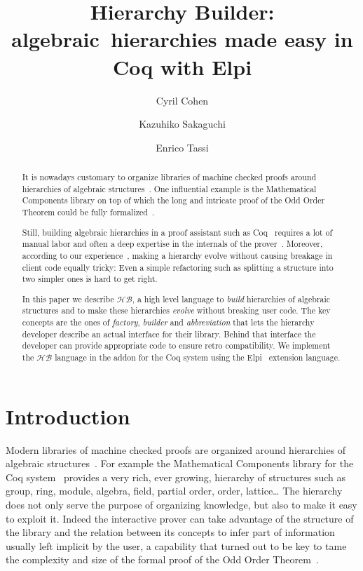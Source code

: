 \documentclass[a4paper,UKenglish,cleveref, autoref]{lipics-v2019}
\title{Hierarchy Builder: algebraic~hierarchies made easy in Coq with Elpi} %
\author{Cyril Cohen}{Inria, France}{Cyril.Cohen@inria.fr}{}{}
\author{Kazuhiko Sakaguchi}{University of Tsukuba, Japan}{sakaguchi@logic.cs.tsukuba.ac.jp}{}{}
\author{Enrico Tassi}{Inria, France}{Enrico.Tassi@inria.fr}{}{}
\newcommand{\HB}{\ensuremath{\mathcal{HB}}}
\newcommand{\hb}{\coq{hierarchy-builder}}
\newcommand{\factory}{factory}
\newcommand{\phantterm}{abbreviation}
\newcommand{\mixinbuilder}{builder}
\theoremstyle{implem}
\theoremstyle{implem}
\theoremstyle{command}
\begin{document}
\maketitle

\begin{abstract}
It is nowadays customary to organize libraries of machine checked
proofs around hierarchies of algebraic
structures~\cite{10.1145/3372885.3373824,mathclasses,DBLP:journals/mics/BoldoLM15,DBLP:conf/mpc/AffeldtNS19}.
One influential example is the Mathematical Components library on top
of which the long and intricate proof of the Odd Order
Theorem could be fully formalized~\cite{DBLP:conf/itp/GonthierAABCGRMOBPRSTT13}.

Still, building algebraic hierarchies in a proof assistant such as Coq~\cite{Coq:manual}
requires a lot of manual labor and often a deep expertise in the internals of
the prover~\cite{DBLP:conf/tphol/GarillotGMR09,DBLP:conf/itp/MahboubiT13}.
Moreover, according to our experience~\cite{KSdraft},
making a hierarchy evolve without causing breakage in client code equally tricky:
Even a simple refactoring such as splitting a structure into two simpler ones
is hard to get right.

In this paper we describe \HB{}, a high level language
to \emph{build} hierarchies of algebraic structures and to make these hierarchies
\emph{evolve} without breaking user code. The key concepts are the ones of
\emph{\factory{}}, \emph{\mixinbuilder{}} and \emph{\phantterm{}} that lets the hierarchy developer
describe an actual
interface for their library. Behind that interface the developer can provide
appropriate code to ensure retro compatibility.
We implement the \HB{} language in the \hb{} addon for the Coq
system using the Elpi~\cite{DBLP:conf/lpar/DunchevGCT15,CoqElpi}
extension language.
\end{abstract}

\section{Introduction}

Modern libraries of machine checked proofs are organized around
hierarchies of algebraic structures~\cite{10.1145/3372885.3373824,mathclasses,DBLP:journals/mics/BoldoLM15,DBLP:conf/mpc/AffeldtNS19}.
For example the Mathematical Components library for the Coq system~\cite{Coq:manual}
provides a very rich, ever growing, hierarchy of structures such as
group, ring, module, algebra, field, partial order, order, lattice\ldots
The hierarchy does not only serve the purpose of organizing knowledge, but
also to make it easy to exploit it. Indeed the interactive prover can
take advantage of the structure of the library and the relation between
its concepts to infer part of information usually left implicit
by the user, a capability that turned out to be key to tame
the complexity and size of the formal proof of the Odd Order
Theorem~\cite{DBLP:conf/itp/GonthierAABCGRMOBPRSTT13}.
\end{document}
